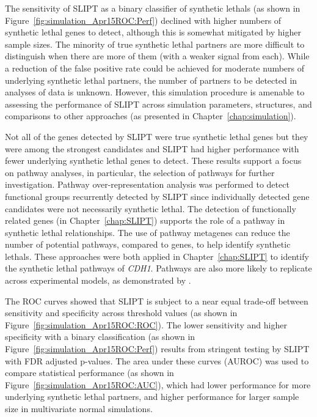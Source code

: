 The sensitivity of \gls{SLIPT} as a binary classifier of \glspl{synthetic lethal} (as shown in Figure~\ref{fig:simulation_Apr15ROC:Perf}) declined with higher numbers of \gls{synthetic lethal} genes to detect, although this is somewhat mitigated by higher sample sizes. The minority of true \gls{synthetic lethal} partners are more difficult to distinguish when there are more of them (with a weaker  signal from each). While a reduction of the false positive rate could be achieved for moderate numbers of underlying \gls{synthetic lethal} partners, the number of partners to be detected in analyses of  data is unknown. However, this simulation procedure is amenable to assessing the performance of \gls{SLIPT} across simulation parameters,  structures, and comparisons to other approaches (as presented in Chapter~\ref{chap:simulation}).

Not all of the genes detected by \gls{SLIPT} were true \gls{synthetic lethal} genes but they were among the strongest candidates and \gls{SLIPT} had higher performance with fewer underlying \gls{synthetic lethal} genes to detect. These results support a focus on pathway analyses, in particular, the selection of pathways for further investigation. Pathway over-representation analysis was performed to detect functional groups recurrently detected by \gls{SLIPT} since individually detected gene candidates were not necessarily \gls{synthetic lethal}. The detection of functionally related genes (in Chapter~\ref{chap:SLIPT}) supports the role of a pathway in \gls{synthetic lethal} relationships. The use of pathway \glspl{metagene} can reduce the number of potential pathways, compared to genes, to help identify \glspl{synthetic lethal}. These approaches were both applied in Chapter~\ref{chap:SLIPT} to identify the \gls{synthetic lethal} pathways of \textit{CDH1}. Pathways are also more likely to replicate across experimental models, as demonstrated by \citet{Dixon2008}.
 
The \gls{ROC} curves showed that \gls{SLIPT} is subject to a near equal trade-off between sensitivity and specificity across threshold values (as shown in Figure~\ref{fig:simulation_Apr15ROC:ROC}). The lower sensitivity and higher specificity with a binary classification (as shown in Figure~\ref{fig:simulation_Apr15ROC:Perf}) results from stringent testing by \gls{SLIPT} with \gls{FDR} adjusted p-values. The area under these curves (\gls{AUROC}) was used to compare statistical performance (as shown in Figure~\ref{fig:simulation_Apr15ROC:AUC}), which had lower performance for more underlying \gls{synthetic lethal} partners, and higher performance for larger sample size in multivariate normal simulations.

